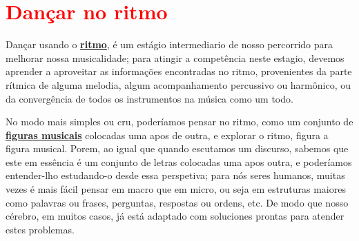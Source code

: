 
\newpage
\section{\textcolor{red}{Dançar no ritmo}}
\label{subsec:dancaritmo}
 Dançar usando o \hyperref[sec:pos:Ritmo]{\textbf{ritmo}},
é um estágio intermediario de nosso percorrido para melhorar nossa musicalidade;
para atingir a competência neste estagio, 
devemos aprender a aproveitar as informações encontradas 
no ritmo, provenientes da parte rítmica de alguma melodia, algum acompanhamento percussivo ou harmônico, 
ou da convergência de todos os instrumentos na música como um todo.

No modo mais simples ou cru, poderíamos pensar no ritmo,
como um conjunto de \hyperref[sec:figurasmusicais]{\textbf{figuras musicais}} 
colocadas uma apos de outra, 
e explorar o ritmo, figura a figura musical. %
Porem, ao igual que quando escutamos um discurso,
sabemos que este em essência é um conjunto de letras colocadas uma apos outra,
e poderíamos entender-lho estudando-o desde essa perspetiva;
para nós seres humanos, 
muitas vezes é mais fácil pensar em macro que em micro,
ou seja em estruturas maiores como palavras ou frases, perguntas, respostas ou ordens, etc. 
De modo que nosso cérebro, em muitos casos, 
já está adaptado com soluciones prontas para atender estes problemas.


